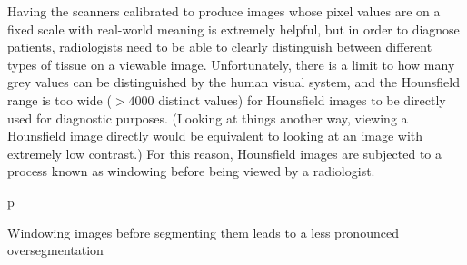 Having the scanners calibrated to produce images whose pixel values are on a fixed scale with real-world meaning is extremely helpful, but in order to diagnose patients, radiologists need to be able to clearly distinguish between different types of tissue on a viewable image. Unfortunately, there is a limit to how many grey values can be distinguished by the human visual system, and the Hounsfield range is too wide ($> 4000$ distinct values) for Hounsfield images to be directly used for diagnostic purposes. (Looking at things another way, viewing a Hounsfield image directly would be equivalent to looking at an image with extremely low contrast.) For this reason, Hounsfield images are subjected to a process known as windowing before being viewed by a radiologist.


\begin{stusubfig}{p}
	\hspace{4mm}%
\caption{Windowing images before segmenting them leads to a less pronounced oversegmentation}
\label{fig:segmentation-watershed-hounsfieldvswindowed}
\end{stusubfig}

